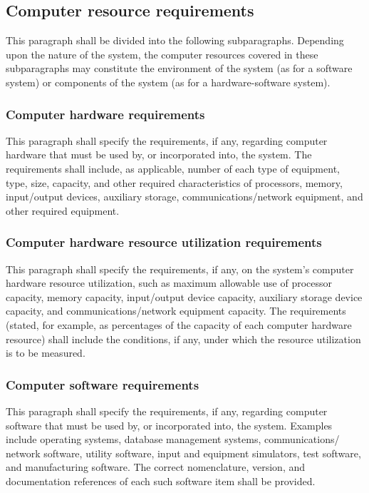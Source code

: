 \documentclass{fidata-report-template}
\begin{document}
\subsection{Computer resource requirements}

This paragraph shall be divided into the following subparagraphs.
Depending upon the nature of the system, the computer resources covered
in these subparagraphs may constitute the environment of the system (as
for a software system) or components of the system (as for a
hardware-software system).

\subsubsection{Computer hardware requirements}

This paragraph shall specify the requirements, if any, regarding
computer hardware that must be used by, or incorporated into, the
system. The requirements shall include, as applicable, number of each
type of equipment, type, size, capacity, and other required
characteristics of processors, memory, input/output devices, auxiliary
storage, communications/network equipment, and other required equipment.

\subsubsection{Computer hardware resource utilization
requirements}

This paragraph shall specify the requirements, if any, on the system's
computer hardware resource utilization, such as maximum allowable use of
processor capacity, memory capacity, input/output device capacity,
auxiliary storage device capacity, and communications/network equipment
capacity. The requirements (stated, for example, as percentages of the
capacity of each computer hardware resource) shall include the
conditions, if any, under which the resource utilization is to be
measured.

\subsubsection{Computer software requirements}

This paragraph shall specify the requirements, if any, regarding
computer software that must be used by, or incorporated into, the
system. Examples include operating systems, database management systems,
communications/ network software, utility software, input and equipment
simulators, test software, and manufacturing software. The correct
nomenclature, version, and documentation references of each such
software item shall be provided.
\end{document}
